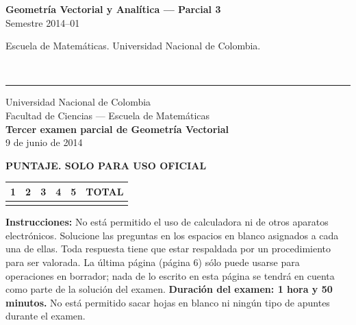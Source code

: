 \documentclass[11pt]{article}
\newcommand{\examheader}{%
  \noindent
  \begin{minipage}[t]{0.6\linewidth}
    {\small\bfseries Geometría Vectorial y Analítica --- Parcial 3}\\
    {\small Semestre 2014--01}
  \end{minipage}%
  \hfill
  \begin{minipage}[t]{0.35\linewidth}
    \raggedleft\small Escuela de Matemáticas. Universidad Nacional de Colombia.
  \end{minipage}\\[2pt]
  \rule{\linewidth}{0.6pt}
}
\begin{document}
\examheader

\begin{center}
Universidad Nacional de Colombia\\
Facultad de Ciencias --- Escuela de Matemáticas\\
\textbf{Tercer examen parcial de Geometría Vectorial}\\
9 de junio de 2014
\end{center}

\vspace{10pt}
\textbf{PUNTAJE. SOLO PARA USO OFICIAL}

\begin{center}
\begin{tabular}{|c|c|c|c|c|c|}
\hline
1 & 2 & 3 & 4 & 5 & TOTAL \\
\hline
 & & & & & \\
\hline
\end{tabular}
\end{center}

\vspace{10pt}
\textbf{Instrucciones:} No está permitido el uso de calculadora ni de otros aparatos electrónicos. Solucione las preguntas en los espacios en blanco asignados a cada una de ellas. Toda respuesta tiene que estar respaldada por un procedimiento para ser valorada. La última página (página 6) sólo puede usarse para operaciones en borrador; nada de lo escrito en esta página se tendrá en cuenta como parte de la solución del examen. \textbf{Duración del examen: 1 hora y 50 minutos.} No está permitido sacar hojas en blanco ni ningún tipo de apuntes durante el examen.
\end{document}

